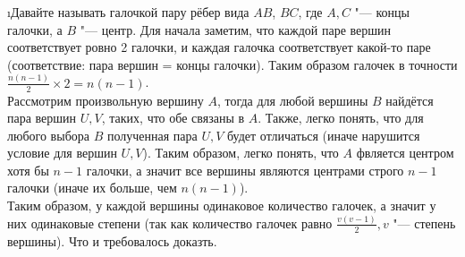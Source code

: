\i Давайте называть галочкой пару рёбер вида $AB$, $BC$, где $A, C$ "--- концы галочки, а $B$ "--- центр. Для начала заметим, что каждой паре вершин соответствует ровно 2 галочки, и каждая галочка соответствует какой-то паре (соответствие: пара вершин = концы галочки). Таким образом галочек в точности $\frac{n(n-1)}{2} \times 2 = n(n-1)$.\\
Рассмотрим произвольную вершину $A$, тогда для любой вершины $B$ найдётся пара вершин $U, V$, таких, что обе связаны в $A$. Также, легко понять, что для любого выбора $B$ полученная пара $U, V$ будет отличаться (иначе нарушится условие для вершин $U, V$). Таким образом, легко понять, что $A$ фвляется центром хотя бы $n-1$ галочки, а значит все вершины являются центрами строго $n-1$ галочки (иначе их больше, чем $n(n-1)$).\\
Таким образом, у каждой вершины одинаковое количество галочек, а значит у них одинаковые степени (так как количество галочек равно $\frac{v(v-1)}{2}, v$ "--- степень вершины). Что и требовалось доказть.
